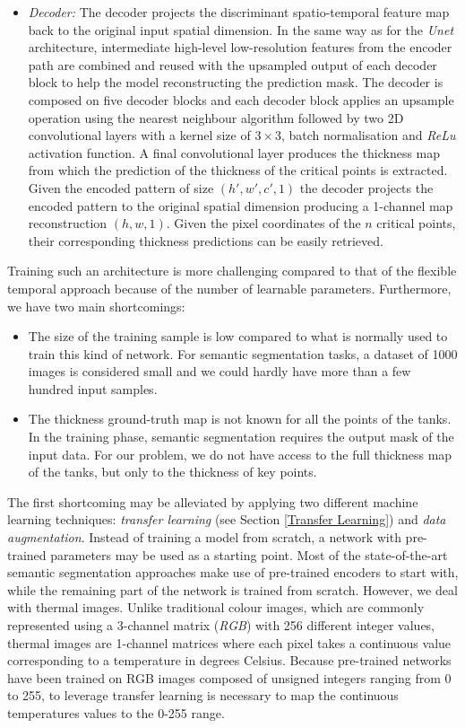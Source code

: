 \begin{itemize}
    \item \textit{Decoder:} The decoder projects the discriminant spatio-temporal feature map back to the original input spatial dimension. In the same way as for the \textit{Unet} architecture, intermediate high-level low-resolution features from the encoder path are combined and reused with the upsampled output of each decoder block to help the model reconstructing the prediction mask. The decoder is composed on five decoder blocks and each decoder block applies an upsample operation using the nearest neighbour algorithm followed by two 2D convolutional layers with a kernel size of $3\times 3$, batch normalisation and \textit{ReLu} activation function. A final convolutional layer produces the thickness map from which the prediction of the thickness of the critical  points is extracted. Given the encoded pattern of size $(h', w', c', 1)$ the decoder projects the encoded pattern to the original spatial dimension producing a 1-channel map reconstruction $(h, w, 1)$. Given the pixel coordinates of the $n$ critical points, their corresponding thickness predictions can be easily retrieved.
\end{itemize}

Training such an architecture is more challenging compared to that of the flexible temporal approach because of the number of learnable parameters. Furthermore, we have two main shortcomings:

\begin{itemize}
    \item The size of the training sample is low compared to what is normally used to train this kind of network. For semantic segmentation tasks, a dataset of 1000 images is considered small and we could hardly have more than a few hundred input samples.
    \item The thickness ground-truth map is not known for all the points of the tanks. In the training phase, semantic segmentation requires the output mask of the input data. For our problem, we do not have access to the full thickness map of the tanks, but only to the thickness of key points.
\end{itemize}

The first shortcoming may be alleviated by applying two different machine learning techniques: \textit{transfer learning} (see Section \ref{Transfer Learning}) and \textit{data augmentation}. Instead of training a model from scratch, a network with pre-trained parameters may be used as a starting point. Most of the state-of-the-art semantic segmentation approaches make use of pre-trained encoders to start with, while the remaining part of the network is trained from scratch. However, we deal with thermal images. Unlike traditional colour images, which are commonly represented using a 3-channel matrix (\textit{RGB}) with 256 different integer values, thermal images are 1-channel matrices where each pixel takes a continuous value corresponding to a temperature in degrees Celsius. Because pre-trained networks have been trained on RGB images composed of unsigned integers ranging from 0 to 255, to leverage transfer learning is necessary to map the continuous temperatures values to the 0-255 range. 

